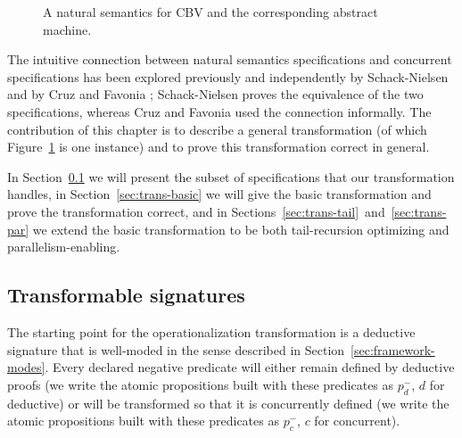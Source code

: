 \begin{figure}
\begin{minipage}[b]{0.36\linewidth}
\end{minipage}
\hspace{0.5cm}
\begin{minipage}[b]{0.64\linewidth}
\end{minipage}
\caption{A natural semantics for CBV and the corresponding abstract machine.}
\label{fig:example-transform-cbv}
\end{figure}

The intuitive connection between natural semantics specifications and
concurrent specifications has been explored previously and
independently by Schack-Nielsen \cite{schacknielsen07induction} and by
Cruz and Favonia \cite{cruz12parallel}; Schack-Nielsen proves the
equivalence of the two specifications, whereas Cruz and Favonia used
the connection informally. The contribution of this chapter is to
describe a general transformation (of which
Figure~\ref{fig:example-transform-cbv} is one instance) and to prove
this transformation correct in general. 

In Section~\ref{sec:trans-subset} we will present the subset of
specifications that our transformation handles, in
Section~\ref{sec:trans-basic} we will give the basic transformation
and prove the transformation correct, and in
Sections~\ref{sec:trans-tail}~and~\ref{sec:trans-par} we extend the
basic transformation to be both tail-recursion optimizing and
parallelism-enabling.

\subsection{Transformable signatures}
\label{sec:trans-subset}

The starting point for the operationalization transformation is a
deductive signature that is well-moded in the sense described in
Section~\ref{sec:framework-modes}. Every declared negative predicate
will either remain defined by deductive proofs (we write the atomic
propositions built with these predicates as $p_d^-$, $d$ for
deductive) or will be transformed so that it is concurrently defined
(we write the atomic propositions built with these predicates as
$p_c^-$, $c$ for concurrent).

